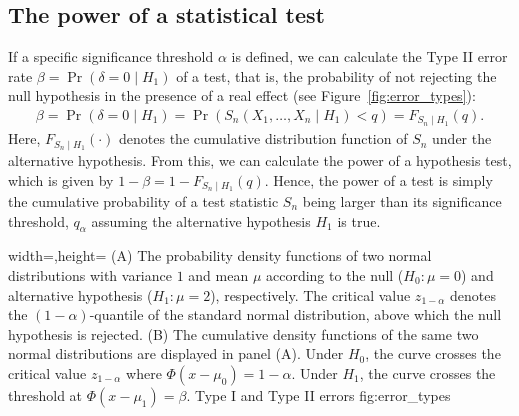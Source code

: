 \subsection{The power of a statistical test}
\label{subsec:power}
If a specific significance threshold $\alpha$ is defined, we can calculate the Type II error rate ${\beta = \Pr(\delta = 0\mid H_1)}$ of a test, that is, the probability of not rejecting the null hypothesis in the presence of a real effect (see Figure~\ref{fig:error_types}):
\begin{align*}
    \beta = \Pr(\delta = 0\mid H_1) = \Pr(S_n(X_1,\dots,X_n\mid H_1) < q) = F_{S_n\mid H_1}(q).
\end{align*}
Here, ${F_{S_n\mid H_1}(\cdot)}$ denotes the cumulative distribution function of $S_n$ under the alternative hypothesis. From this, we can calculate the power of a hypothesis test, which is given by ${1 - \beta = 1-F_{S_n\mid H_1}(q)}$. Hence, the power of a test is simply the cumulative probability of a test statistic $S_n$ being larger than its significance threshold, $q_\alpha$ assuming the alternative hypothesis $H_1$ is true.

  {width=\textwidth,height=\textheight}%
  {(A) The probability density functions of two normal distributions with variance $1$ and mean $\mu$ according to the null ($H_0: \mu = 0$) and alternative hypothesis (${H_1: \mu = 2}$), respectively. The critical value $z_{1-\alpha}$ denotes the $(1-\alpha)$-quantile of the standard normal distribution, above which the null hypothesis is rejected. (B) The cumulative density functions of the same two normal distributions are displayed in panel (A). Under $H_0$, the curve crosses the critical value $z_{1-\alpha}$ where ${\Phi(x - \mu_0) = 1-\alpha}$. Under $H_1$, the curve crosses the threshold at ${\Phi(x - \mu_1) = \beta}$.}%
  {Type I and Type II errors} %
  {fig:error_types} %


